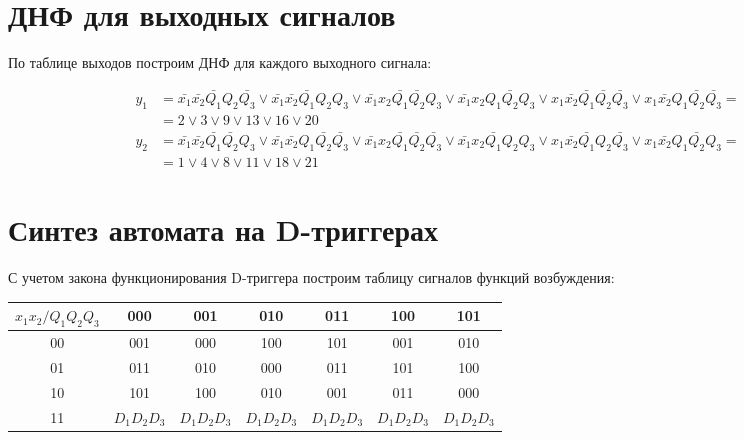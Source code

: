 \documentclass[listings]{labreport}
\begin{document}
\section*{ДНФ для выходных сигналов}

По таблице выходов построим ДНФ для каждого выходного сигнала:

\begin{align*}
y_1 & = \bar{x_1}\bar{x_2}\bar{Q_1}Q_2\bar{Q_3} \lor \bar{x_1}\bar{x_2}\bar{Q_1}Q_2Q_3 \lor \bar{x_1}x_2\bar{Q_1}\bar{Q_2}Q_3 \lor \bar{x_1}x_2Q_1\bar{Q_2}Q_3 \lor x_1\bar{x_2}\bar{Q_1}\bar{Q_2}\bar{Q_3} \lor x_1\bar{x_2}Q_1\bar{Q_2}\bar{Q_3} = \\ & = 2 \lor 3 \lor 9 \lor 13 \lor 16 \lor 20 \\
y_2 & = \bar{x_1}\bar{x_2}\bar{Q_1}\bar{Q_2}Q_3 \lor \bar{x_1}\bar{x_2}Q_1\bar{Q_2}\bar{Q_3} \lor \bar{x_1}x_2\bar{Q_1}\bar{Q_2}\bar{Q_3} \lor \bar{x_1}x_2\bar{Q_1}Q_2Q_3 \lor x_1\bar{x_2}\bar{Q_1}Q_2\bar{Q_3} \lor x_1\bar{x_2}Q_1\bar{Q_2}Q_3 = \\ & = 1 \lor 4 \lor 8 \lor 11 \lor 18 \lor 21
\end{align*}

\section*{Синтез автомата на D-триггерах}

С учетом закона функционирования D-триггера построим таблицу
сигналов функций возбуждения:

\begin{tabular}{|*{7}{c|}}
\hline
$x_1x_2/Q_1Q_2Q_3$ & 000 & 001 & 010 & 011 & 100 & 101\\\hline
00 & 001 & 000 & 100 & 101 & 001 & 010\\\hline
01 & 011 & 010 & 000 & 011 & 101 & 100\\\hline
10 & 101 & 100 & 010 & 001 & 011 & 000\\\hline
11 & $D_1D_2D_3$ & $D_1D_2D_3$ & $D_1D_2D_3$ & $D_1D_2D_3$ & $D_1D_2D_3$ & $D_1D_2D_3$\\\hline
\end{tabular}
\end{document}
